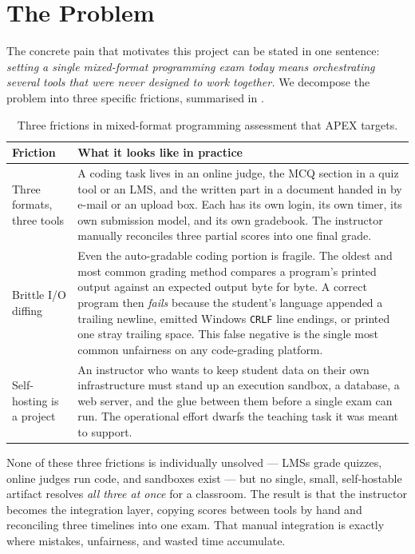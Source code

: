 \section{The Problem}

The concrete pain that motivates this project can be stated in one sentence:
\emph{setting a single mixed-format programming exam today means orchestrating
several tools that were never designed to work together.} We decompose the
problem into three specific frictions, summarised in
.

\begin{table}[htbp]
\centering
\caption{Three frictions in mixed-format programming assessment that APEX
targets.}
\label{tab:pain-points}
\begin{tabularx}{\linewidth}{@{}L{3.1cm}X@{}}
\toprule
\textbf{Friction} & \textbf{What it looks like in practice} \\
\midrule
Three formats,
three tools &
A coding task lives in an online judge, the MCQ section in a quiz tool or an
LMS, and the written part in a document handed in by e-mail or an upload box.
Each has its own login, its own timer, its own submission model, and its own
gradebook. The instructor manually reconciles three partial scores into one
final grade. \\
\addlinespace
Brittle I/O
diffing &
Even the auto-gradable coding portion is fragile. The oldest and most common
grading method compares a program's printed output against an expected output
byte for byte. A correct program then \emph{fails} because the student's
language appended a trailing newline, emitted Windows \texttt{CRLF} line
endings, or printed one stray trailing space. This false negative is the
single most common unfairness on any code-grading platform. \\
\addlinespace
Self-hosting
is a project &
An instructor who wants to keep student data on their own infrastructure must
stand up an execution sandbox, a database, a web server, and the glue between
them before a single exam can run. The operational effort dwarfs the teaching
task it was meant to support. \\
\bottomrule
\end{tabularx}
\end{table}

None of these three frictions is individually unsolved --- LMSs grade quizzes,
online judges run code, and sandboxes exist --- but no single, small,
self-hostable artifact resolves \emph{all three at once} for a classroom.
The result is that the instructor becomes the integration layer, copying
scores between tools by hand and reconciling three timelines into one exam.
That manual integration is exactly where mistakes, unfairness, and wasted time
accumulate.

